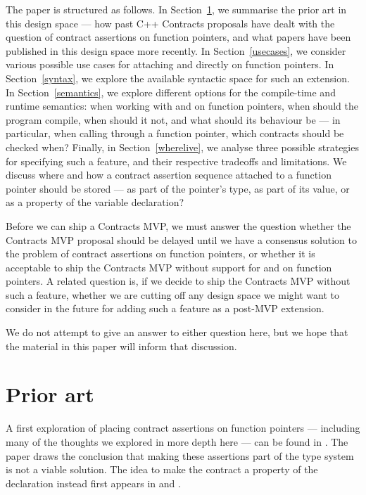 The paper is structured as follows. In Section~\ref{priorart}, we summarise the prior art in this design space --- how past C++ Contracts proposals have dealt with the question of contract assertions on function pointers, and what papers have been published in this design space more recently. In Section~\ref{usecases}, we consider various possible use cases for attaching  and  directly on function pointers. In Section~\ref{syntax}, we explore the available syntactic space for such an extension. In Section~\ref{semantics}, we explore different options for the compile-time and runtime semantics: when working with  and  on function pointers, when should the program compile, when should it not, and what should its behaviour be --- in particular, when calling through a function pointer, which contracts should be checked when? Finally, in Section~\ref{wherelive}, we analyse three possible strategies for specifying such a feature, and their respective tradeoffs and limitations. We discuss where and how a contract assertion sequence attached to a function pointer should be stored --- as part of the pointer's type, as part of its value, or as a property of the variable declaration?

Before we can ship a Contracts MVP, we must answer the question whether the Contracts MVP proposal \cite{P2900R9} should be delayed until we have a consensus solution to the problem of contract assertions on function pointers, or whether it is acceptable to ship the Contracts MVP without support for  and  on function pointers. A related question is, if we decide to ship the Contracts MVP without such a feature, whether we are cutting off any design space we might want to consider in the future for adding such a feature as a post-MVP extension.

We do not attempt to give an answer to either question here, but we hope that the material in this paper will inform that discussion.


\section{Prior art}
\label{priorart}

A first exploration of placing contract assertions on function pointers --- including many of the thoughts we explored in more depth here --- can be found in \cite{N4110}. The paper draws the conclusion that making these assertions part of the type system is not a viable solution. The idea to make the contract a property of the declaration instead first appears in  \cite{P0246R0} and \cite{P0247R0}.

